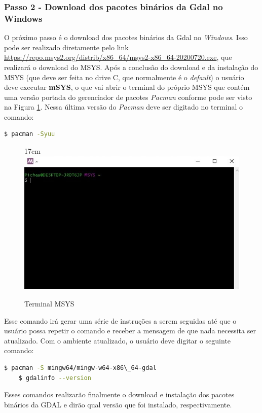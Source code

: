 \subsubsection{Passo 2 - Download dos pacotes binários da Gdal no Windows} 
O próximo passo é o download dos pacotes binários da Gdal no \textit{Windows}. Isso pode ser realizado diretamente pelo link  \url{https://repo.msys2.org/distrib/x86\_64/msys2-x86\_64-20200720.exe}, que realizará o download do MSYS. Após a conclusão do download e da instalação do MSYS (que deve ser feita no drive C, que normalmente é o \textit{default}) o usuário deve executar \textbf{mSYS}, o que vai abrir o terminal do próprio MSYS que contém uma versão portada do gerenciador de pacotes \textit{Pacman} conforme pode ser visto na Figura \ref{fig:terminalgdal}. Nessa última versão do \textit{Pacman} deve ser digitado no terminal o comando:

\begin{lstlisting}[language=bash]
$ pacman -Syuu
\end{lstlisting}
 
\begin{figure}[!ht]{17cm}
 	\centering
 	\includegraphics[width=12cm]{Figuras/terminalgdal.jpg}
 	\caption{Terminal MSYS} \label{fig:terminalgdal}
\end{figure}
 

Esse comando irá gerar uma série de instruções a serem seguidas até que o usuário possa repetir o comando e receber a mensagem de que nada necessita ser atualizado. Com o ambiente atualizado, o usuário deve digitar o seguinte comando:
\begin{lstlisting}[language=bash]
 	$ pacman -S mingw64/mingw-w64-x86\_64-gdal
 	$ gdalinfo --version
\end{lstlisting}

Esses comandos realizarão finalmente o download e instalação dos pacotes binários da GDAL e dirão qual versão que foi instalado, respectivamente. 
 
